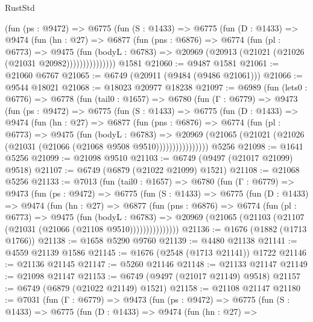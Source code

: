 \begin{lexlean}{RustStd}
\begin{coremodule}
            (fun (ps : @9472) =>
            @6775
              (fun (S : @1433) =>
              @6775
                (fun (D : @1433) =>
                @9474
                  (fun (hn : @27) =>
                  @6877
                    (fun (pns : @6876) =>
                    @6774
                      (fun (pl : @6773) =>
                      @9475
                        (fun (bodyL : @6783) =>
                        @20969 (@20913 (@21021 (@21026 (@21031 @20982)))))))))))))))
    @1581
@21060 := @9487 @1581
@21061 := @21060 @6767
@21065 := @6749 (@20911 (@9484 (@9486 @21061)))
@21066 := @9544 @18021
@21068 := @18023 @20977 @18238
@21097 := @6989
    (fun (lets0 : @6776) =>
    @6778
      (fun (tail0 : @1657) =>
      @6780
        (fun (Γ : @6779) =>
        @9473
          (fun (ps : @9472) =>
          @6775
            (fun (S : @1433) =>
            @6775
              (fun (D : @1433) =>
              @9474
                (fun (hn : @27) =>
                @6877
                  (fun (pns : @6876) =>
                  @6774
                    (fun (pl : @6773) =>
                    @9475
                      (fun (bodyL : @6783) =>
                      @20969
                        (@21065 (@21021 (@21026 (@21031 (@21066 (@21068 @9508 @9510))))))))))))))))
    @5256
@21098 := @1641 @5256
@21099 := @21098 @9510
@21103 := @6749 (@9497 (@21017 @21099) @9518)
@21107 := @6749 (@6879 (@21022 @21099) @1521)
@21108 := @21068 @5256
@21133 := @7013
    (fun (tail0 : @1657) =>
    @6780
      (fun (Γ : @6779) =>
      @9473
        (fun (ps : @9472) =>
        @6775
          (fun (S : @1433) =>
          @6775
            (fun (D : @1433) =>
            @9474
              (fun (hn : @27) =>
              @6877
                (fun (pns : @6876) =>
                @6774
                  (fun (pl : @6773) =>
                  @9475
                    (fun (bodyL : @6783) =>
                    @20969 (@21065 (@21103 (@21107 (@21031 (@21066 (@21108 @9510)))))))))))))))
@21136 := @1676 (@1882 (@1713 @1766))
@21138 := @1658 @5290 @9760
@21139 := @4480 @21138
@21141 := @4559 @21139 @1586
@21145 := @1676 (@2548 (@1713 @21141)) @1722
@21146 := @21136 @21145
@21147 := @5260 @21146
@21148 := @21133 @21147
@21149 := @21098 @21147
@21153 := @6749 (@9497 (@21017 @21149) @9518)
@21157 := @6749 (@6879 (@21022 @21149) @1521)
@21158 := @21108 @21147
@21180 := @7031
    (fun (Γ : @6779) =>
    @9473
      (fun (ps : @9472) =>
      @6775
        (fun (S : @1433) =>
        @6775
          (fun (D : @1433) =>
          @9474
            (fun (hn : @27) =>

\end{coremodule}
\end{lexlean}

